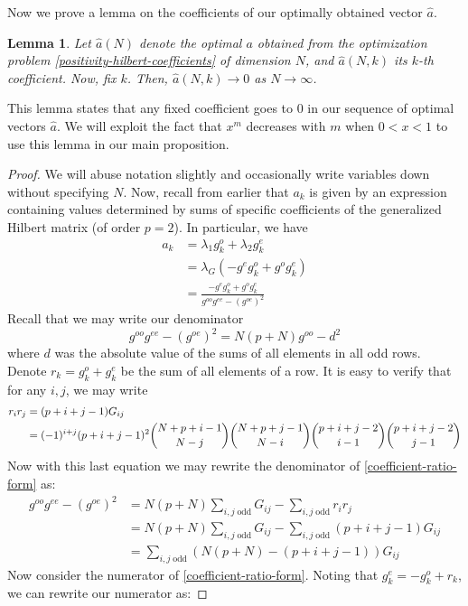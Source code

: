 \documentclass[11pt]{article}
\newtheorem{lem}[thm]{Lemma}
\theoremstyle{definition}
\theoremstyle{remark}
\numberwithin{equation}{section}
\begin{document}
Now we prove a lemma on the coefficients of our optimally obtained vector $\hat{a}$.
\begin{lem}\label{coefficients-vanish}
Let $\hat{a}(N)$ denote the optimal $a$ obtained from the optimization problem \ref{positivity-hilbert-coefficients} of dimension $N$, and $\hat{a}(N,k)$ its $k$-th coefficient. Now, fix $k$. Then, $\hat{a}(N,k) \to 0$ as $N\to \infty$.
\end{lem}
This lemma states that any fixed coefficient goes to 0 in our sequence of optimal vectors $\hat{a}$. We will exploit the fact that $x^m$ decreases with $m$ when $0<x<1$ to use this lemma in our main proposition. 
\begin{proof}
We will abuse notation slightly and occasionally write variables down without specifying $N$. Now, recall from earlier that $a_k$ is given by an expression containing values determined by sums of specific coefficients of the generalized Hilbert matrix (of order $p=2$). In particular, we have 
\begin{align}
a_{k} &= \lambda_1 g_k^o + \lambda_2g^e_k \\
&= \lambda_G(-g^eg_k^o + g^og_k^e) \\
&= \frac{-g^eg_k^o + g^og_k^e}{g^{oo} g^{ee}-(g^{oe})^2}\label{coefficient-ratio-form}
\end{align}
Recall that we may write our denominator
\[g^{oo} g^{ee}-(g^{oe})^2 = N(p+N)g^{oo} - d^2 \]
where $d$ was the absolute value of the sums of all elements in all odd rows. Denote $r_k = g_k^o + g_k^e$ be the sum of all elements of a row. It is easy to verify that for any $i,j$, we may write
\begin{align*}
r_ir_j &= (p+i+j-1) G_{ij} \\
&= (-1)^{i+j}(p+i+j-1)^2 \dbinom{N+p+i-1}{N-j} \dbinom{N+p+j-1}{N-i} \dbinom{p+i+j-2}{i-1} \dbinom{p+i+j-2}{j-1}
\end{align*}
Now with this last equation we may rewrite the denominator of \ref{coefficient-ratio-form} as:
\begin{align*}
g^{oo} g^{ee}-(g^{oe})^2 &= N(p+N) \sum_{i,j \; \text{odd}} G_{ij} - \sum_{i,j \; \text{odd}} r_ir_j \\
&= N(p+N) \sum_{i,j \; \text{odd}} G_{ij} - \sum_{i,j \; \text{odd}} (p+i+j-1) G_{ij}\\
&= \sum_{i,j \; \text{odd}}  (N(p+N) -(p+i+j-1))G_{ij}
\end{align*}
Now consider the numerator of  \ref{coefficient-ratio-form}. Noting that $g_k^e = -g_k^o + r_k$, we can rewrite our numerator as: 

\end{proof}
\end{document}
